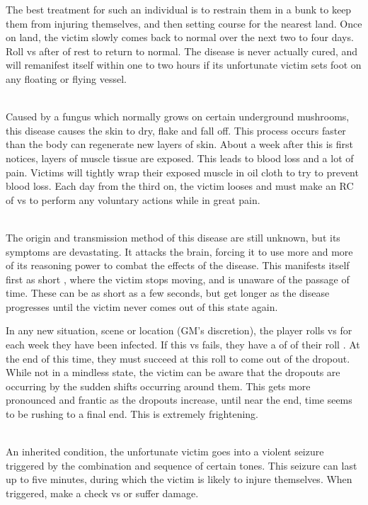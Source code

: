 \begin{multicols}{2}
The best treatment for such an individual is to restrain them in a bunk to keep them from injuring themselves, and then setting course for the nearest land. Once on land, the victim slowly comes back to normal over the next two to four days. Roll  vs \HEA after  of rest to return to normal. The disease is never actually cured, and will remanifest itself within one to two hours if its unfortunate victim sets foot on any floating or flying vessel.

\\
Caused by a fungus which normally grows on certain underground mushrooms, this disease causes the skin to dry, flake and fall off. This process occurs faster than the body can regenerate new layers of skin. About a week after this is first notices, layers of muscle tissue are exposed. This leads to blood loss and a lot of pain. Victims will tightly wrap their exposed muscle in oil cloth to try to prevent blood loss. Each day from the third on, the victim looses  \DP and must make an RC of  vs \WIL to perform any voluntary actions while in great pain.

\\
The origin and transmission method of this disease are still unknown, but its symptoms are devastating. It attacks the brain, forcing it to use more and more of its reasoning power to combat the effects of the disease. This manifests itself first as short , where the victim stops moving, and is unaware of the passage of time. These can be as short as a few seconds, but get longer as the disease progresses until the victim never comes out of this state again.

In any new situation, scene or location (GM's discretion), the player rolls  vs \WIL for each week they have been infected. If this \RC vs \WIL fails, they have a  of  of their roll . At the end of this time, they must succeed at this roll to come out of the dropout. While not in a mindless state, the victim can be aware that the dropouts are occurring by the sudden shifts occurring around them. This gets more pronounced and frantic as the dropouts increase, until near the end, time seems to be rushing to a final end. This is extremely frightening.

\\
An inherited condition, the unfortunate victim goes into a violent seizure triggered by the combination and sequence of certain tones. This seizure can last up to five minutes, during which the victim is likely to injure themselves. When triggered, make a  check vs \HEA or suffer  \DP damage.


\end{multicols}
